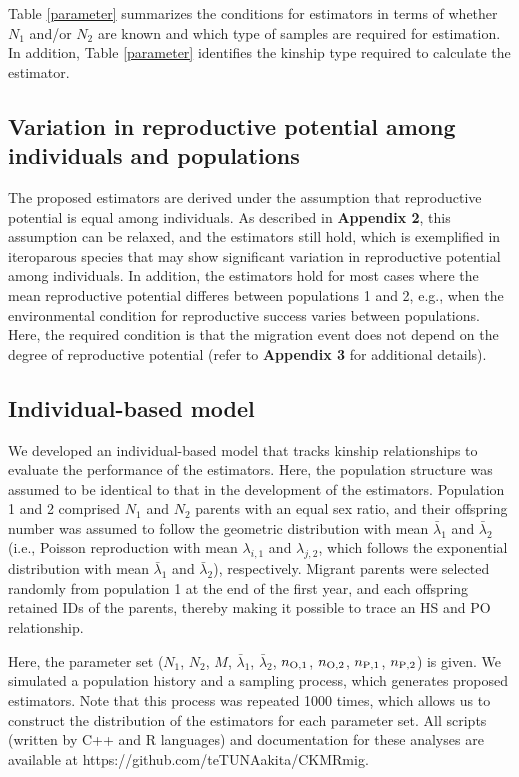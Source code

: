 \documentclass[12pt, English]{article}
\begin{document}
\begin{spacing}{1.9}
Table \ref{parameter} summarizes the conditions for estimators in terms of whether $N_1$ and/or $N_2$ are known and which type of samples are required for estimation. In addition, Table \ref{parameter} identifies the kinship type required to calculate the estimator. 

\subsection{Variation in reproductive potential among individuals and populations}

The proposed estimators are derived under the assumption that reproductive potential is equal among individuals. As described in {\bf Appendix 2}, this assumption can be relaxed, and the estimators still hold, which is exemplified in iteroparous species that may show significant variation in reproductive potential among individuals. In addition, the estimators hold for most cases where the mean reproductive potential differes between populations 1 and 2, e.g., when the environmental condition for reproductive success varies between populations. Here, the required condition is that the migration event does not depend on the degree of reproductive potential (refer to {\bf Appendix 3} for additional details). 

\subsection{Individual-based model}

We developed an individual-based model that tracks kinship relationships to evaluate the performance of the estimators. Here, the population structure was assumed to be identical to that in the development of the estimators. Population 1 and 2 comprised $N_1$ and $N_2$ parents with an equal sex ratio, and their offspring number was assumed to follow the geometric distribution with mean ${\bar \lambda_1}$ and ${\bar \lambda_2}$ (i.e., Poisson reproduction with mean $\lambda_{i,1}$ and $\lambda_{j,2}$, which follows the exponential distribution with mean ${\bar \lambda_1}$ and ${\bar \lambda_2}$), respectively. Migrant parents were selected randomly from population 1 at the end of the first year, and each offspring retained IDs of the parents, thereby making it possible to trace an HS and PO relationship.

Here, the parameter set ($N_1$, $N_2$, $M$, ${\bar \lambda_1}$, ${\bar \lambda_2}$, $n_{\rm O,1}$, $n_{\rm O,2}$, $n_{\rm P,1}$, $n_{\rm P,2}$) is given. We simulated a population history and a sampling process, which generates proposed estimators. Note that this process was repeated 1000 times, which allows us to construct the distribution of the estimators for each parameter set. All scripts (written by C{++} and R languages) and documentation for these analyses are available at https://github.com/teTUNAakita/CKMRmig.


\end{spacing}
\end{document}
